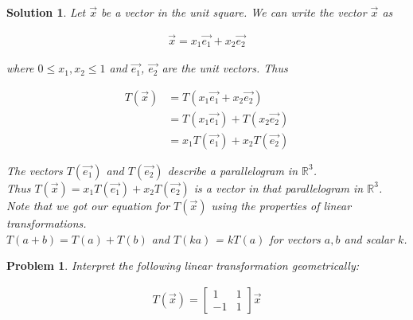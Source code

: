 \documentclass{article}
\newtheorem{problem}{Problem}
\newtheorem*{solution}{Solution}
\begin{document}
\begin{solution}
Let $\vec{x}$ be a vector in the unit square. We can write the vector $\vec{x}$ as 

\begin{align*}
\vec{x} = x_{1} \vec{e_{1}} + x_{2} \vec{e_{2}}
\end{align*}
 
where $0 \leq x_{1}, x_{2} \leq 1$ and $\vec{e_{1}}$, $\vec{e_{2}}$ are the unit vectors. Thus

\begin{align*}
T(\vec{x}) &= T(x_{1} \vec{e_{1}} + x_{2} \vec{e_{2}}) \\\
&= T(x_{1} \vec{e_{1}}) + T(x_{2} \vec{e_{2}}) \\
&= x_{1} T(\vec{e_{1}}) + x_{2} T(\vec{e_{2}}) 
\end{align*}

The vectors $T(\vec{e_{1}})$ and $T(\vec{e_{2}})$ describe a parallelogram in $\mathbb{R}^3$. \\

Thus $T(\vec{x}) =  x_{1} T(\vec{e_{1}}) + x_{2} T(\vec{e_{2}})$ is a vector in that parallelogram in $\mathbb{R}^3$. \\

Note that we got our equation for $T(\vec{x})$ using the properties of linear transformations. \\

$T(a+b) = T(a) + T(b)$ and $T(ka)$ = $kT(a)$ for vectors $a, b$ and scalar $k$.
\end{solution} 

\begin{problem}
Interpret the following linear transformation geometrically:

\begin{align*}
T(\vec{x}) = \begin{bmatrix} 1 & 1 \\ -1 & 1 \end{bmatrix} \vec{x}
\end{align*}
\end{problem}
\end{document}
